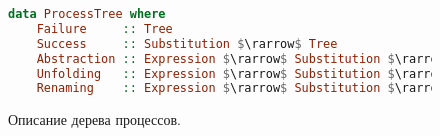 \begin{figure}[h!]
\begin{lstlisting}[mathescape,language=Haskell]
  data ProcessTree where
    Failure     :: Tree
    Success     :: Substitution $\rarrow$ Tree
    Abstraction :: Expression $\rarrow$ Substitution $\rarrow$ Tree
    Unfolding   :: Expression $\rarrow$ Substitution $\rarrow$ Tree
    Renaming    :: Expression $\rarrow$ Substitution $\rarrow$ Tree
\end{lstlisting}
\caption{Описание дерева процессов.}
\label{fig:ptree}
\end{figure}
% 
% 
% 

